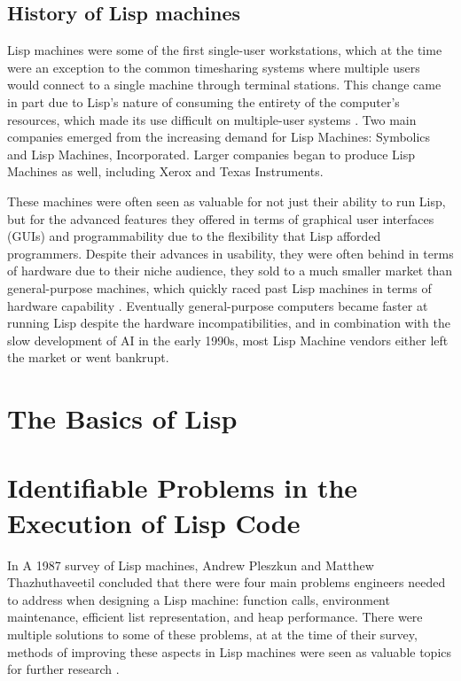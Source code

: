 \documentclass[journal]{IEEEtran}
\begin{document}
\subsection{History of Lisp machines}
Lisp machines were some of the first single-user workstations, which at the time were an exception to the common timesharing systems where multiple users would connect to a single machine through terminal stations. This change came in part due to Lisp's nature of consuming the entirety of the computer's resources, which made its use difficult on multiple-user systems \cite{andromeda}. Two main companies emerged from the increasing demand for Lisp Machines: Symbolics and Lisp Machines, Incorporated. Larger companies began to produce Lisp Machines as well, including Xerox and Texas Instruments. 

These machines were often seen as valuable for not just their ability to run Lisp, but for the advanced features they offered in terms of graphical user interfaces (GUIs) and programmability due to the flexibility that Lisp afforded programmers. Despite their advances in usability, they were often behind in terms of hardware due to their niche audience, they sold to a much smaller market than general-purpose machines, which quickly raced past Lisp machines in terms of hardware capability \cite{withington}. Eventually general-purpose computers became faster at running Lisp despite the hardware incompatibilities, and in combination with the slow development of AI in the early 1990s, most Lisp Machine vendors either left the market or went bankrupt.

\section{The Basics of Lisp}

\section{Identifiable Problems in the Execution of Lisp Code}
In A 1987 survey of Lisp machines, Andrew Pleszkun and Matthew Thazhuthaveetil concluded that there were four main problems engineers needed to address when designing a Lisp machine: function calls, environment maintenance, efficient list representation, and heap performance. There were multiple solutions to some of these problems, at at the time of their survey, methods of improving these aspects in Lisp machines were seen as valuable topics for further research \cite{pt}.
\end{document}
